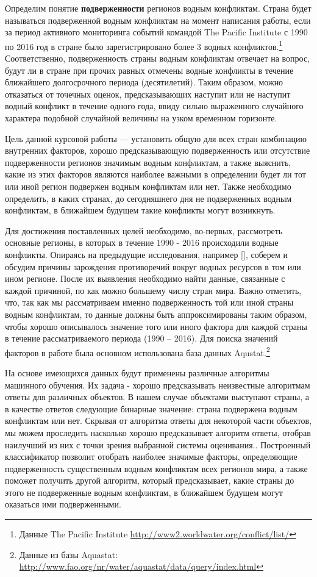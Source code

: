 \documentclass[a4paper, 12pt]{article}
\theoremstyle{plain} %
\theoremstyle{definition} %
\theoremstyle{remark} %
\begin{document}
Определим понятие \textbf{подверженности} регионов водным конфликтам. Страна будет называться подверженной водным конфликтам на момент написания работы, если за период активного мониторинга событий командой The Pacific Institute с 1990 по 2016 год в стране было зарегистрировано более 3 водных конфликтов.\footnote{Данные The Pacific Institute \url{http://www2.worldwater.org/conflict/list/}} Соответственно, подверженность страны водным конфликтам отвечает на вопрос, будут ли в стране при прочих равных отмечены водные конфликты в течение ближайшего долгосрочного периода (десятилетий). Таким образом, можно отказаться от точечных оценок, предсказывающих наступит или не наступит водный конфликт в течение одного года, ввиду сильно выраженного случайного характера подобной случайной величины на узком временном горизонте.

Цель данной курсовой работы --- установить общую для всех стран комбинацию внутренних факторов, хорошо предсказывающую подверженность или отсутствие подверженности регионов значимым водным конфликтам, а также выяснить, какие из этих факторов являются наиболее важными в определении будет ли тот или иной регион подвержен водным конфликтам или нет. Также необходимо определить, в каких странах, до сегодняшнего дня не подверженных водным конфликтам, в ближайшем будущем такие конфликты могут возникнуть. 

Для достижения поставленных целей необходимо, во-первых, рассмотреть основные регионы, в которых в течение 1990 - 2016 происходили водные конфликты. Опираясь на предыдущие исследования, например [\cite{ashton}], соберем и обсудим причины зарождения противоречий вокруг водных ресурсов в том или ином регионе. После их выявления необходимо найти данные, связанные с каждой причиной, по как можно большему числу стран мира. Важно отметить, что, так как мы рассматриваем именно подверженность той или иной страны водным конфликтам, то данные должны быть аппроксимированы таким образом, чтобы хорошо описывалось значение того или иного фактора для каждой страны в течение рассматриваемого периода (1990 – 2016). Для поиска значений факторов в работе была основном использована база данных Aqustat.\footnote{Данные из базы Aquastat: \url{http://www.fao.org/nr/water/aquastat/data/query/index.html}} 

На основе имеющихся данных будут применены различные алгоритмы машинного обучения. Их задача - хорошо предсказывать неизвестные алгоритмам ответы для различных объектов. В нашем случае объектами выступают страны, а в качестве ответов следующие бинарные значение: страна подвержена водным конфликтам или нет. Скрывая от алгоритма ответы для некоторой части объектов, мы можем проследить насколько хорошо предсказывает алгоритм ответы, отобрав наилучший из них с точки зрения выбранной системы оценивания.. Построенный классификатор позволит отобрать наиболее значимые факторы, определяющие подверженность существенным водным конфликтам всех регионов мира, а также поможет получить другой алгоритм, который предсказывает, какие страны до этого не подверженные водным конфликтам, в ближайшем будущем могут оказаться ими подверженными.  
\end{document}
